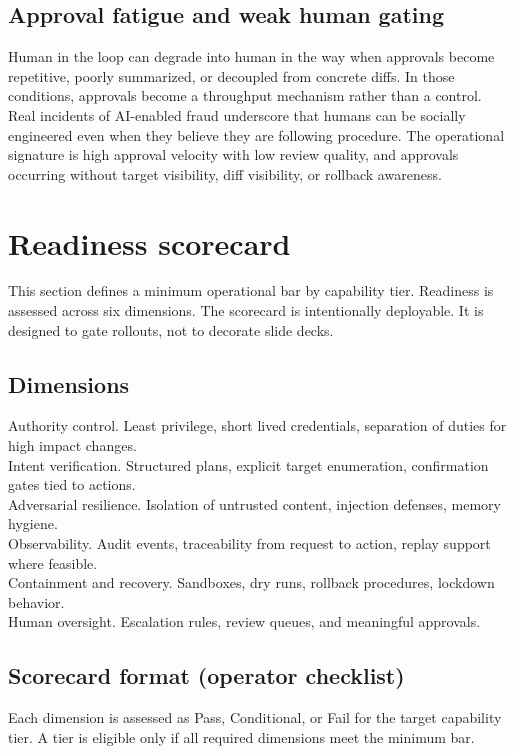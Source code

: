 \documentclass[11pt]{article}
\begin{document}
\subsection{Approval fatigue and weak human gating}
Human in the loop can degrade into human in the way when approvals become repetitive, poorly summarized, or decoupled from concrete diffs. In those conditions, approvals become a throughput mechanism rather than a control. Real incidents of AI-enabled fraud underscore that humans can be socially engineered even when they believe they are following procedure. The operational signature is high approval velocity with low review quality, and approvals occurring without target visibility, diff visibility, or rollback awareness.

\section{Readiness scorecard}
This section defines a minimum operational bar by capability tier. Readiness is assessed across six dimensions. The scorecard is intentionally deployable. It is designed to gate rollouts, not to decorate slide decks.

\subsection{Dimensions}
Authority control. Least privilege, short lived credentials, separation of duties for high impact changes.\\
Intent verification. Structured plans, explicit target enumeration, confirmation gates tied to actions.\\
Adversarial resilience. Isolation of untrusted content, injection defenses, memory hygiene.\\
Observability. Audit events, traceability from request to action, replay support where feasible.\\
Containment and recovery. Sandboxes, dry runs, rollback procedures, lockdown behavior.\\
Human oversight. Escalation rules, review queues, and meaningful approvals.

\subsection{Scorecard format (operator checklist)}
Each dimension is assessed as Pass, Conditional, or Fail for the target capability tier. A tier is eligible only if all required dimensions meet the minimum bar.
\end{document}
